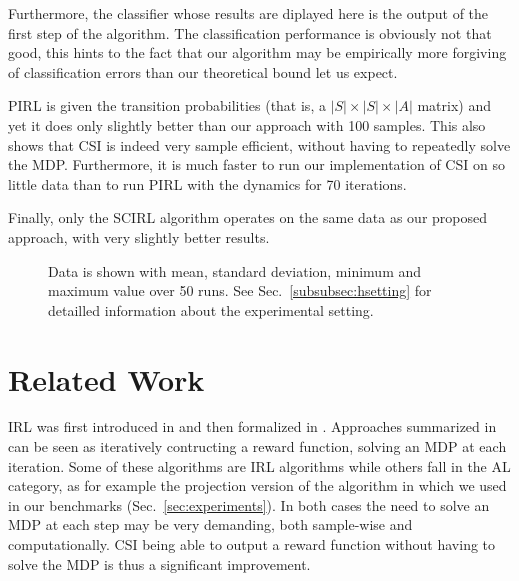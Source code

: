 \documentclass[smallextended]{svjour3}
\begin{document}
Furthermore, the classifier whose results are diplayed here is the output of the first step of the algorithm. The classification performance is obviously not that good, this hints to the fact that our algorithm may be empirically more forgiving of classification errors than our theoretical bound let us expect.

PIRL is given the transition probabilities (that is, a $|S|\times |S|\times |A|$ matrix) and yet it does only slightly better than our approach with 100 samples. This also shows that CSI is indeed very sample efficient, without having to repeatedly solve the MDP. Furthermore, it is much faster to run our implementation of CSI on so little data than to run PIRL with the dynamics for 70 iterations.

Finally, only the SCIRL algorithm operates on the same data as our proposed approach, with very slightly better results.

\begin{figure}

  \caption{Data is shown with mean, standard deviation, minimum and maximum value over 50 runs. See Sec.~\ref{subsubsec:hsetting} for detailled information about the experimental setting.}
  \label{fig:Highway}
\end{figure}


\section{Related Work}
\label{sec:related}
IRL was first introduced in \cite{russell1998learning} and then formalized in \cite{ng2000algorithms}. Approaches summarized in \cite{neu2009training} can be seen as iteratively contructing a reward function, solving an MDP at each iteration. Some of these algorithms are IRL algorithms while others fall in the AL category, as for example the projection version of the algorithm in \cite{abbeel2004apprenticeship} which we used in our benchmarks (Sec.~\ref{sec:experiments}). In both cases the need to solve an MDP at each step may be very demanding, both sample-wise and computationally. CSI being able to output a reward function without having to solve the MDP is thus a significant improvement.
\end{document}

